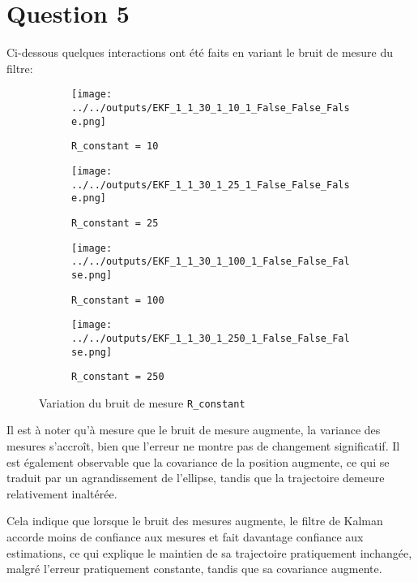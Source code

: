 \documentclass[../CSC_5RO12_TA_TP2.tex]{subfiles}
\begin{document}
\section{Question 5}
\noindent Ci-dessous quelques interactions ont été faits en variant le bruit de mesure du filtre:
\begin{figure}[H]
    \centering
    \begin{subfigure}[b]{0.475\textwidth}
        \centering
        \texttt{[image: ../../outputs/EKF\_1\_1\_30\_1\_10\_1\_False\_False\_False.png]}
        \caption{\texttt{R\_constant = 10}}
        \label{}
    \end{subfigure}\hfill
    \begin{subfigure}[b]{0.475\textwidth}
        \centering
        \texttt{[image: ../../outputs/EKF\_1\_1\_30\_1\_25\_1\_False\_False\_False.png]}
        \caption{\texttt{R\_constant = 25}}
        \label{}
    \end{subfigure}
    \begin{subfigure}[b]{0.475\textwidth}
        \centering
        \texttt{[image: ../../outputs/EKF\_1\_1\_30\_1\_100\_1\_False\_False\_False.png]}
        \caption{\texttt{R\_constant = 100}}
        \label{}
    \end{subfigure}\hfill
    \begin{subfigure}[b]{0.475\textwidth}
        \centering
        \texttt{[image: ../../outputs/EKF\_1\_1\_30\_1\_250\_1\_False\_False\_False.png]}
        \caption{\texttt{R\_constant = 250}}
        \label{}
    \end{subfigure}
    \caption{Variation du bruit de mesure \texttt{R\_constant}}
    \label{}
\end{figure}
\noindent Il est à noter qu'à mesure que le bruit de mesure augmente, la variance des mesures s'accroît, bien que l'erreur ne montre pas de changement significatif. Il est également observable que la covariance de la position augmente, ce qui se traduit par un agrandissement de l'ellipse, tandis que la trajectoire demeure relativement inaltérée.
\begin{remark}
    Cela indique que lorsque le bruit des mesures augmente, le filtre de Kalman accorde moins de confiance aux mesures et fait davantage confiance aux estimations, ce qui explique le maintien de sa trajectoire pratiquement inchangée, malgré l'erreur pratiquement constante, tandis que sa covariance augmente.
\end{remark}
\end{document}
